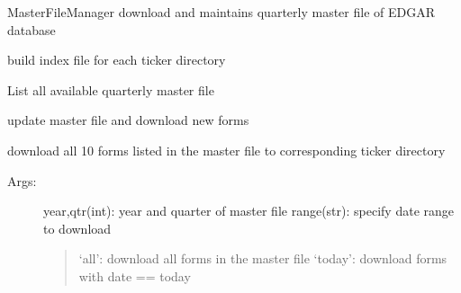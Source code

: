 \documentclass[letterpaper,10pt,english]{sphinxmanual}
\begin{document}
\begin{fulllineitems}
\label{utils:form10DB.Form10Manager}
MasterFileManager download and maintains quarterly master file of
EDGAR database

\begin{fulllineitems}
\label{utils:form10DB.Form10Manager.buildIndex}
build index file for each ticker directory

\end{fulllineitems}


\begin{fulllineitems}
\label{utils:form10DB.Form10Manager.listQuraterMasterFile}
List all available quarterly master file

\end{fulllineitems}


\begin{fulllineitems}
\label{utils:form10DB.Form10Manager.updateAndDownload}
update master file and download new forms

\end{fulllineitems}


\begin{fulllineitems}
\label{utils:form10DB.Form10Manager.updateForms}
download all 10 forms listed in the master file to corresponding ticker directory
\begin{description}
\item[{Args:}] \leavevmode
year,qtr(int):  year and quarter of master file
range(str):     specify date range to download
\begin{quote}

`all': download all forms in the master file
`today': download forms with date == today
\end{quote}

\end{description}


\end{fulllineitems}
\end{fulllineitems}
\end{document}
